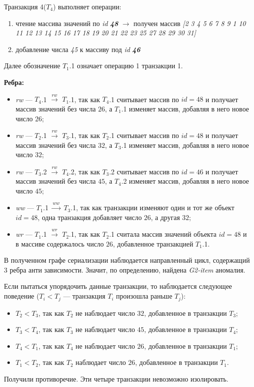 \documentclass[12pt,  openany]{book}
\begin{document}
\par Транзакция 4(\textbf{$T_4$}) выполняет операции:
\begin{enumerate}
\item чтение массива значений по \textit{id} \textit{\textbf{48}} $\rightarrow$ получен массив \textit{[2 3 4 5 6 7 8 9 1 10 11 12 13 14 15 16 17 18 19 20 21 22 23 25 27 28 29 30 31]}
\item добавление числа \textit{45} к массиву под \textit{id} \textit{\textbf{46}}
\end{enumerate}

Далее обозначение \textbf{$T_1$}.1 означает операцию 1 транзакции 1.  

\par \textbf{Ребра:}
\begin{itemize}
\item \textit{rw} --- \textbf{$T_4$}.1 $ \xrightarrow{\textit{rw}}$  \textbf{$T_1$}.1,  так как \textbf{$T_4$}.1 считывает массив по $id=48$ и получает массив значений без числа $26$, а \textbf{$T_1$}.1 изменяет массив, добавляя в него новое число $26$;
\item \textit{rw} --- \textbf{$T_2$}.1 $ \xrightarrow{\textit{rw}}$  \textbf{$T_3$}.1,  так как \textbf{$T_2$}.1 считывает массив по $id=48$ и получает массив значений без числа $32$, а \textbf{$T_3$}.1 изменяет массив, добавляя в него новое число $32$;
\item \textit{rw} --- \textbf{$T_3$}.2 $ \xrightarrow{\textit{rw}}$  \textbf{$T_4$}.2,  так как \textbf{$T_3$}.2 считывает массив по $id=46$ и получает массив значений без числа $45$, а \textbf{$T_4$}.2 изменяет массив, добавляя в него новое число $45$;
\item \textit{ww} --- \textbf{$T_1$}.1 $ \xrightarrow{\textit{ww}}$  \textbf{$T_3$}.1, так как транзакции изменяют один и тот же объект $id=48$, одна транзакция добавляет число $26$, а другая $32$;
\item \textit{wr} --- \textbf{$T_1$}.1 $ \xrightarrow{\textit{wr}}$  \textbf{$T_2$}.1, так как \textbf{$T_2$}.1 считала массив значений объекта $id=48$ и в массиве содержалось число $26$, добавленное транзакцией \textbf{$T_1$}.1.
\end{itemize}
В полученном графе сериализации наблюдается направленный цикл, содержащий 3 ребра анти зависимости. Значит, по определению, найдена \textit{G2-item} аномалия.
\par Если пытаться упорядочить данные транзакции, то наблюдается следующее поведение ($T_i<T_j$ --- транзакция $T_i$ произошла раньше $T_j$):
\begin{itemize}
\item $T_2 < T_3$, так как $T_2$ не наблюдает число $32$, добавленное в транзакции $T_3$; 
\item $T_3 < T_4$, так как $T_3$ не наблюдает число $45$, добавленное в транзакции $T_4$; 
\item $T_4 < T_1$, так как $T_4$ не наблюдает число $26$, добавленное в транзакции $T_1$;
\item $T_1 < T_2$, так как $T_2$ наблюдает число $26$, добавленное в транзакции $T_1$.  
\end{itemize}
Получили противоречие. Эти четыре транзакции невозможно изолировать.
\end{document}
